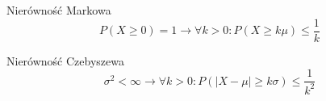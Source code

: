 \documentclass{mp}
\begin{document}
\begin{frame}{Nierówność Markowa}
\[ P(X\geq 0)=1 \to \forall k>0\colon P(X\geq k\mu)\leq \frac{1}{k} \]
\end{frame}
\begin{frame}{Nierówność Czebyszewa}
\[\sigma^2<\infty \to \forall k>0\colon P(\left|X-\mu\right|\geq k\sigma)\leq \frac{1}{k^2} \]
\end{frame}
\end{document}
